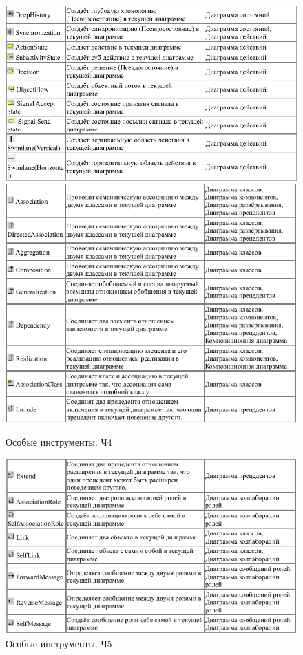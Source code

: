 \documentclass[a4paper,12pt]{report}
\begin{document}
\begin{figure}
	\centering
	\includegraphics[width=0.9\linewidth]{images/diffinstruments4}
	\includegraphics[width=0.9055\linewidth]{images/diffinstruments5}
	\caption{Особые инструменты. Ч4}
	\label{fig:diffinstruments4}
\end{figure}
\newpage
\begin{figure}[h!]
	\centering
	\includegraphics[width=0.9\linewidth]{images/diffinstruments6}
	\caption{Особые инструменты. Ч5}
	\label{fig:diffinstruments5}
\end{figure}
\end{document}
